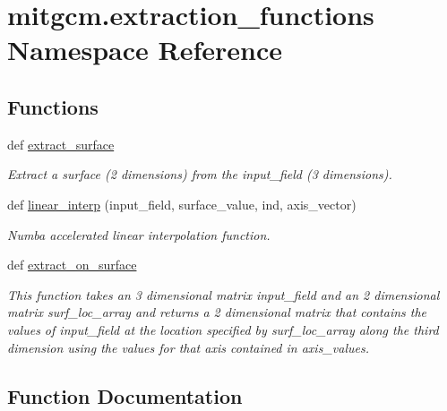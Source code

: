 \hypertarget{namespacemitgcm_1_1extraction__functions}{}\section{mitgcm.\+extraction\+\_\+functions Namespace Reference}
\label{namespacemitgcm_1_1extraction__functions}
\subsection*{Functions}
\begin{DoxyCompactItemize}
\item 
def \hyperlink{namespacemitgcm_1_1extraction__functions_ac997450bd917bdcefd2a182494d8c4a8}{extract\+\_\+surface}
\begin{DoxyCompactList}\small\item\em Extract a surface (2 dimensions) from the input\+\_\+field (3 dimensions). \end{DoxyCompactList}\item 
def \hyperlink{namespacemitgcm_1_1extraction__functions_ae60d3f743ac70de8a67ac7cd2c1f6758}{linear\+\_\+interp} (input\+\_\+field, surface\+\_\+value, ind, axis\+\_\+vector)
\begin{DoxyCompactList}\small\item\em Numba accelerated linear interpolation function. \end{DoxyCompactList}\item 
def \hyperlink{namespacemitgcm_1_1extraction__functions_a8f2297e92f5424a6ffb8b55bad6eff24}{extract\+\_\+on\+\_\+surface}
\begin{DoxyCompactList}\small\item\em This function takes an 3 dimensional matrix \textquotesingle{}input\+\_\+field\textquotesingle{} and an 2 dimensional matrix \textquotesingle{}surf\+\_\+loc\+\_\+array\textquotesingle{} and returns a 2 dimensional matrix that contains the values of input\+\_\+field at the location specified by surf\+\_\+loc\+\_\+array along the third dimension using the values for that axis contained in \textquotesingle{}axis\+\_\+values\textquotesingle{}. \end{DoxyCompactList}\end{DoxyCompactItemize}


\subsection{Function Documentation}
\hypertarget{namespacemitgcm_1_1extraction__functions_a8f2297e92f5424a6ffb8b55bad6eff24}{}
